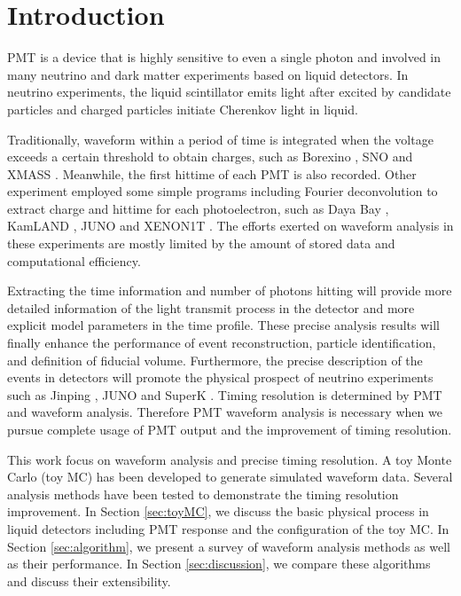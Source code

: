 \section{Introduction} %
\label{sec:introduction}

PMT is a device that is highly sensitive to even a single photon and involved in many neutrino and dark matter experiments based on liquid detectors. In neutrino experiments, the liquid scintillator emits light after excited by candidate particles and charged particles initiate Cherenkov light in liquid. 

Traditionally, waveform within a period of time is integrated when the voltage exceeds a certain threshold to obtain charges, such as Borexino \cite{lagomarsino_gateless_1999}, SNO \cite{dunger_event_2019} and XMASS \cite{abe_xmass_2013}. Meanwhile, the first hittime of each PMT is also recorded. Other experiment employed some simple programs including Fourier deconvolution to extract charge and hittime for each photoelectron, such as Daya Bay \cite{huang_flash_2018}, KamLAND \cite{the_kamland_collaboration_production_2010}, JUNO \cite{zhang_comparison_2019} and XENON1T \cite{aprile_xenon1t_2019}. The efforts exerted on waveform analysis in these experiments are mostly limited by the amount of stored data and computational efficiency. 

Extracting the time information and number of photons hitting will provide more detailed information of the light transmit process in the detector and more explicit model parameters in the time profile. These precise analysis results will finally enhance the performance of event reconstruction, particle identification, and definition of fiducial volume. Furthermore, the precise description of the events in detectors will promote the physical prospect of neutrino experiments such as Jinping \cite{beacom_physics_2017}, JUNO \cite{an_neutrino_2016} and SuperK \cite{noauthor_super-kamiokande_2003}. Timing resolution is determined by PMT and waveform analysis. Therefore PMT waveform analysis is necessary when we pursue complete usage of PMT output and the improvement of timing resolution. 

This work focus on waveform analysis and precise timing resolution. A toy Monte Carlo (toy MC) has been developed to generate simulated waveform data. Several analysis methods have been tested to demonstrate the timing resolution improvement. In Section \ref{sec:toyMC}, we discuss the basic physical process in liquid detectors including PMT response and the configuration of the toy MC. In Section \ref{sec:algorithm}, we present a survey of waveform analysis methods as well as their performance. In Section \ref{sec:discussion}, we compare these algorithms and discuss their extensibility. 

